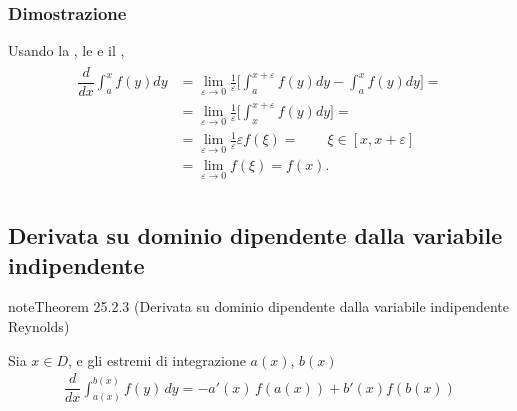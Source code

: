 \documentclass[letterpaper,10pt,italian]{jupyterBook}
\begin{document}
\subsubsection*{Dimostrazione}

\sphinxAtStartPar
{} Usando la {\hyperref[\detokenize{ch/infinitesimal_calculus/derivatives:infinitesimal-calculus-derivatives-def}]{}}, le {\hyperref[\detokenize{ch/infinitesimal_calculus/integrals:infinitesimal-calculus-integrals-def-definite-prop}]{}} e il {\hyperref[\detokenize{ch/infinitesimal_calculus/integrals:infinitesimal-calculus-integrals-thm-avg}]{}},
\begin{equation*}
\begin{split}\begin{aligned}
\dfrac{d}{dx} \int_{a}^x f(y) dy & = \lim_{\varepsilon \rightarrow 0 }\frac{1}{\varepsilon} \Big[ \int_{a}^{x+\varepsilon} f(y) dy - \int_{a}^{x} f(y) dy \Big] = \\
& = \lim_{\varepsilon \rightarrow 0 }\frac{1}{\varepsilon} \Big[ \int_{x}^{x+\varepsilon} f(y) dy \Big] = \\
& = \lim_{\varepsilon \rightarrow 0 } \frac{1}{\varepsilon} \varepsilon f(\xi) = \qquad \xi \in [x,x+\varepsilon] \\
& = \lim_{\varepsilon \rightarrow 0 } f(\xi) = f(x) . \\
\end{aligned}\end{split}
\end{equation*}

\subsection{Derivata su dominio dipendente dalla variabile indipendente}
\label{\detokenize{ch/infinitesimal_calculus/integrals:derivata-su-dominio-dipendente-dalla-variabile-indipendente}}\label{\detokenize{ch/infinitesimal_calculus/integrals:infinitesimal-calculus-integrals-thm-fund-reynolds}}\label{ch/infinitesimal_calculus/integrals:integrals:thm:fund:reynolds}
\begin{sphinxadmonition}{note}{Theorem 25.2.3 (Derivata su dominio dipendente dalla variabile indipendente \sphinxhyphen{} Reynolds)}



\sphinxAtStartPar
Sia \(x \in D\), e gli estremi di integrazione \(a(x)\), \(b(x)\)  
\begin{equation*}
\begin{split}\dfrac{d}{dx} \int_{a(x)}^{b(x)} f(y) \, dy = - a'(x) \, f(a(x)) + b'(x) f(b(x)) \end{split}
\end{equation*}\end{sphinxadmonition}
\end{document}
